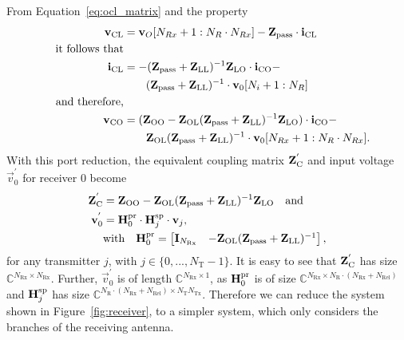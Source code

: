 From Equation~\eqref{eq:ocl_matrix} and the property
\begin{align}
\mathbf{v}_\text{CL} &= \mathbf{v}_O[N_{Rx}+1:N_R\cdot N_{Rx}]-\mathbf{Z}_{\text{pass}}\cdot\mathbf{i}_\text{CL}
\\\nonumber\quad\text{it follows that}&\\
\mathbf{i}_\text{CL} &= -(\mathbf{Z}_{\text{pass}} + \mathbf{Z}_\text{LL})^{-1}\mathbf{Z}_\text{LO}\cdot\mathbf{i}_\text{CO} -\\\nonumber
&\qquad (\mathbf{Z}_{\text{pass}} + \mathbf{Z}_\text{LL})^{-1}\cdot\mathbf{v}_{0}[N_i+1:N_R]\\\nonumber\quad\text{and therefore,}&\\
\mathbf{v}_\text{CO} &= (\mathbf{Z}_\text{OO}-\mathbf{Z}_\text{OL}(\mathbf{Z}_{\text{pass}} + \mathbf{Z}_\text{LL})^{-1}\mathbf{Z}_\text{LO})\cdot\mathbf{i}_\text{CO} -\\\nonumber&\qquad \mathbf{Z}_\text{OL}(\mathbf{Z}_{\text{pass}} + \mathbf{Z}_\text{LL})^{-1}\cdot\mathbf{v}_0[N_{Rx}+1:N_R\cdot N_{Rx}].
\end{align}
With this port reduction, the equivalent coupling matrix $\mathbf{Z}_\text{C}^{'}$ and input voltage $\vec{v}_0^{'}$ for receiver 0 become
\begin{align}
\label{eq:zc_eq}
\mathbf{Z}_\text{C}^{'}&= \mathbf{Z}_\text{OO} - \mathbf{Z}_\text{OL}(\mathbf{Z}_{\text{pass}} + \mathbf{Z}_\text{LL})^{-1}\mathbf{Z}_\text{LO}\quad\text{and}\\\nonumber
\mathbf{v}_0^{'} &= \mathbf{H}_0^{\text{pr}} \cdot\mathbf{H}_{j}^{\text{sp}}\cdot \mathbf{v}_j,\\
\label{eq:port_reduction}
&\text{with}\quad\mathbf{H}_0^{\text{pr}}=
\begin{bmatrix}
\mathbf{I}_{N_\text{Rx}} & -\mathbf{Z}_\text{OL}(\mathbf{Z}_{\text{pass}} + \mathbf{Z}_\text{LL})^{-1}
\end{bmatrix},
\end{align}
for any transmitter $j$, with $j\in\{0,...,N_\text{T}-1\}$.
It is easy to see that $\mathbf{Z}_\text{C}^{'}$ has size $\mathbb{C}^{N_\text{Rx}\times N_\text{Rx}}$.
Further, $\vec{v}_0^{'}$ is of length $\mathbb{C}^{N_\text{Rx}\times 1}$, as 
$\mathbf{H}_0^{\text{pr}}$ is of size 
	$\mathbb{C}^{N_\text{Rx}\times N_\text{R}\cdot\left(N_\text{Rx}+N_\text{Rel}\right)}$ 
and $\mathbf{H}_j^{\text{sp}}$ has size 
	$\mathbb{C}^{N_\text{R}\cdot\left(N_\text{Rx}+N_\text{Rel}\right)\times N_\text{T}N_\text{Tx}}$.
Therefore we can reduce the system shown in Figure~\ref{fig:receiver}, to a simpler system, which only considers the branches of the receiving antenna.





